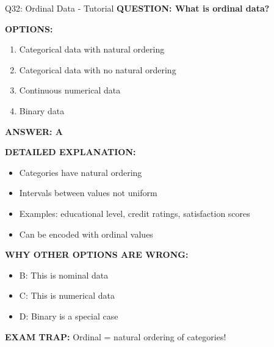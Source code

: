 \documentclass[8pt]{beamer}
\begin{document}
	\begin{frame}{Q32: Ordinal Data - Tutorial}
		\fontsize{6.5}{7.5}\selectfont
		\textbf{QUESTION: What is ordinal data?}
		
		\vspace{0.1cm}
		\textbf{OPTIONS:}
		\begin{enumerate}
			\item Categorical data with natural ordering
			\item Categorical data with no natural ordering
			\item Continuous numerical data
			\item Binary data
		\end{enumerate}
		
		\vspace{0.1cm}
		\textcolor{myblue}{\textbf{ANSWER: A}}
		
		\vspace{0.1cm}
		\textbf{DETAILED EXPLANATION:}
		\begin{itemize}
			\item Categories have natural ordering
			\item Intervals between values not uniform
			\item Examples: educational level, credit ratings, satisfaction scores
			\item Can be encoded with ordinal values
		\end{itemize}
		
		\vspace{0.1cm}
		\textcolor{myred}{\textbf{WHY OTHER OPTIONS ARE WRONG:}}
		\begin{itemize}
			\item \textcolor{myred}{B:} This is nominal data
			\item \textcolor{myred}{C:} This is numerical data
			\item \textcolor{myred}{D:} Binary is a special case
		\end{itemize}
		
		\textcolor{myred}{\textbf{EXAM TRAP:}} Ordinal = \textcolor{myblue}{natural ordering of categories}!
	\end{frame}
	
\end{document}
